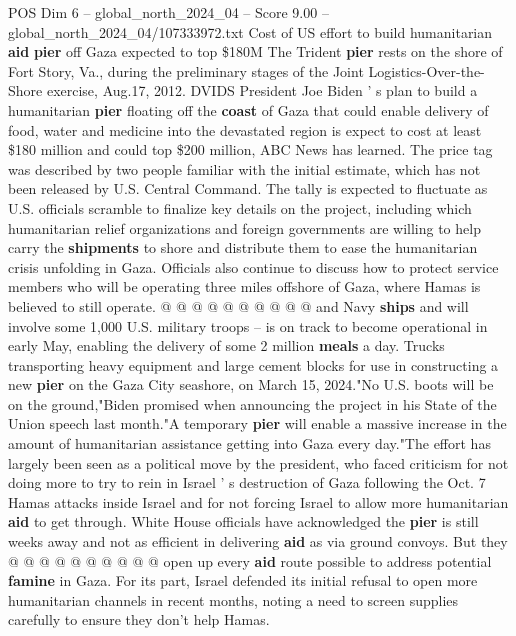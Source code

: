\begin{textsample}{POS Dim 6 – global\_north\_2024\_04 – Score 9.00 – global\_north\_2024\_04/107333972.txt}  \label{ex:f6_pos_077}
Cost of US effort to build humanitarian \textbf{aid} \textbf{pier} off Gaza expected to top \$180M The Trident \textbf{pier} rests on the shore of Fort Story, Va., during the preliminary stages of the Joint Logistics-Over-the-Shore exercise, Aug.17, 2012.
DVIDS President Joe Biden ' s plan to build a humanitarian \textbf{pier} floating off the \textbf{coast} of Gaza that could enable delivery of food, water and medicine into the devastated region is expect to cost at least \$180 million and could top \$200 million, ABC News has learned.
The price tag was described by two people familiar with the initial estimate, which has not been released by U.S.
Central Command.
The tally is expected to fluctuate as U.S. officials scramble to finalize key details on the project, including which humanitarian relief organizations and foreign governments are willing to help carry the \textbf{shipments} to shore and distribute them to ease the humanitarian crisis unfolding in Gaza.
Officials also continue to discuss how to protect service members who will be operating three miles offshore of Gaza, where Hamas is believed to still operate. @ @ @ @ @ @ @ @ @ @ and Navy \textbf{ships} and will involve some 1,000 U.S. military troops -- is on track to become operational in early May, enabling the delivery of some 2 million \textbf{meals} a day.
Trucks transporting heavy equipment and large cement blocks for use in constructing a new \textbf{pier} on the Gaza City seashore, on March 15, 2024."No U.S. boots will be on the ground,"Biden promised when announcing the project in his State of the Union speech last month."A temporary \textbf{pier} will enable a massive increase in the amount of humanitarian assistance getting into Gaza every day."The effort has largely been seen as a political move by the president, who faced criticism for not doing more to try to rein in Israel ' s destruction of Gaza following the Oct. 7 Hamas attacks inside Israel and for not forcing Israel to allow more humanitarian \textbf{aid} to get through.
White House officials have acknowledged the \textbf{pier} is still weeks away and not as efficient in delivering \textbf{aid} as via ground convoys.
But they @ @ @ @ @ @ @ @ @ @ open up every \textbf{aid} route possible to address potential \textbf{famine} in Gaza.
For its part, Israel defended its initial refusal to open more humanitarian channels in recent months, noting a need to screen supplies carefully to ensure they don't help Hamas.

\end{textsample}
